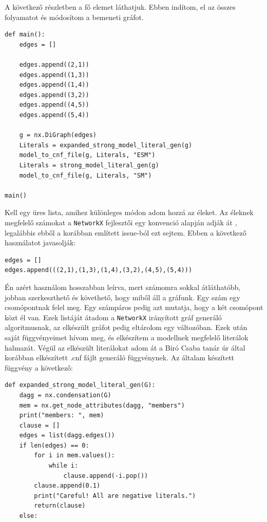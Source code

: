 \documentclass[
]{thesis-ekf}
\theoremstyle{definition}
\theoremstyle{remark}
\begin{document}
	A következő részletben a fő elemet láthatjuk. Ebben indítom, el az összes folyamatot és módosítom a bemeneti gráfot.
	
	\begin{lstlisting}
def main():
	edges = []
	
	edges.append((2,1))
	edges.append((1,3))
	edges.append((1,4))
	edges.append((3,2))
	edges.append((4,5))
	edges.append((5,4))
	
	g = nx.DiGraph(edges)
	Literals = expanded_strong_model_literal_gen(g)
	model_to_cnf_file(g, Literals, "ESM")
	Literals = strong_model_literal_gen(g)
	model_to_cnf_file(g, Literals, "SM")
	
main()
	\end{lstlisting}

	
	Kell egy üres lista, amihez különleges módon adom hozzá az éleket. Az éleknek megfelelő számokat a \texttt{NetworkX} fejlesztői egy konvenció alapján adják át \cite{git-issue-for-examples}, legalábbis ebből a korábban említett issue-ból ezt sejtem. Ebben a következő használatot javasolják:
	
	\begin{lstlisting}
edges = []
edges.append(((2,1),(1,3),(1,4),(3,2),(4,5),(5,4)))
	\end{lstlisting}
	
	Én azért használom hosszabban leírva, mert számomra sokkal átláthatóbb, jobban szerkeszthető és követhető, hogy miből áll a gráfunk. Egy szám egy csomópontnak felel meg. Egy számpáros pedig azt mutatja, hogy a két csomópont közt él van. Ezek listáját átadom a \texttt{NetworkX} irányított gráf generáló algoritmusnak, az elkészült gráfot pedig eltárolom egy változóban. Ezek után saját függvényeimet hívom meg, és elkészítem a modellnek megfelelő literálok halmazát. Végül az elkészült literálokat adom át a Biró Csaba tanár úr által korábban elkészített .cnf fájlt generáló függvénynek.
	\newpage
	Az általam készített függvény a következő:

	\begin{lstlisting}
def expanded_strong_model_literal_gen(G):
	dagg = nx.condensation(G)
	mem = nx.get_node_attributes(dagg, "members")
	print("members: ", mem)
	clause = []
	edges = list(dagg.edges())
	if len(edges) == 0:
		for i in mem.values():
			while i:
				clause.append(-i.pop())
		clause.append(0.1)
		print("Careful! All are negative literals.")
		return(clause)
	else:
	\end{lstlisting}\label{kod-nx-condensation}
\end{document}
